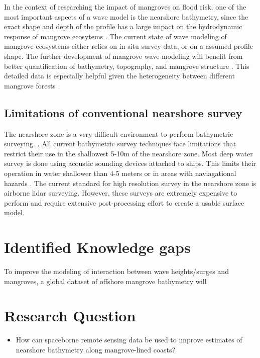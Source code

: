 In the context of researching the impact of mangroves on flood risk, one of the most important aspects of a wave model is the nearshore bathymetry, since the exact shape and depth of the profile has a large impact on the hydrodynamic response of mangrove ecosytems \parencite{Horstman2014,Maza2019}. The current state of wave modeling of mangrove ecosystems either relies on in-situ survey data, or on a assumed profile shape. The further development of mangrove wave modeling will benefit from better quantification of bathymetry, topography, and mangrove structure \parencite{Menendez2020}. This detailed data is especially helpful given the heterogeneity between different mangrove forests \parencite{Mazda2013}.

\subsection{Limitations of conventional nearshore survey}

The nearshore zone is a very difficult environment to perform bathymetric surveying. \parencite{Parrish2019}. All current bathymetric survey techniques face limitations that restrict their use in the shallowest 5-10m of the nearshore zone. Most deep water survey is done using acoustic sounding devices attached to ships. This limits their operation in water shallower than 4-5 meters or in areas with naviagational hazards \parencite{Cesbron2021,add}. The current standard for high resolution survey in the nearshore zone is airborne lidar surveying. However, these surveys are extremely expensive to perform and require extensive post-processing effort to create a usable surface model.

\section{Identified Knowledge gaps}

To improve the modeling of interaction between wave heights/surges and mangroves, a global dataset of offshore mangrove bathymetry will 
\section{Research Question}

\begin{itemize}
      \item How can spaceborne remote sensing data be used to improve estimates of nearshore bathymetry along mangrove-lined coasts?
\end{itemize}


